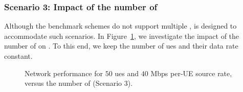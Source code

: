 \subsubsection*{Scenario 3: Impact of the number of \donors{}}
\label{sec:multiDonors}
Although the benchmark schemes do not support multiple \donors{}, \name{} is designed to accommodate such scenarios. In Figure~\ref{fig:avgNetPerfomance_s3}, we investigate the impact of the number of \nodes{} on \name{}. To this end, we keep the number of \glspl{ue} and their data rate constant. 
\begin{figure}[t!]
\centering
{}
\hfill
{}
   \caption{Network performance for $50$ \glspl{ue} and $40$ Mbps per-UE source rate, versus the number of \donors{} (Scenario 3).}
  \label{fig:avgNetPerfomance_s3}
  \vspace*{-3mm}
\end{figure}
